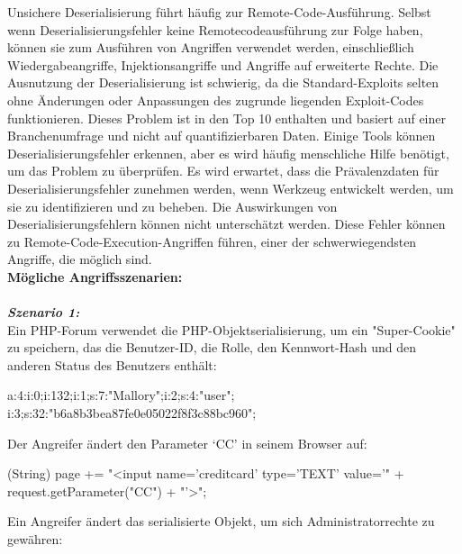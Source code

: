 Unsichere Deserialisierung führt häufig zur Remote-Code-Ausführung. Selbst wenn Deserialisierungsfehler keine Remotecodeausführung zur Folge haben, können sie zum Ausführen von Angriffen verwendet werden, einschließlich Wiedergabeangriffe, Injektionsangriffe und Angriffe auf erweiterte Rechte\cite[6]{owasp17top10}. Die Ausnutzung der Deserialisierung ist schwierig, da die Standard-Exploits selten ohne Änderungen oder Anpassungen des zugrunde liegenden Exploit-Codes funktionieren. Dieses Problem ist in den Top 10 enthalten und basiert auf einer Branchenumfrage und nicht auf quantifizierbaren Daten. Einige Tools können Deserialisierungsfehler erkennen, aber es wird häufig menschliche Hilfe benötigt, um das Problem zu überprüfen. Es wird erwartet, dass die Prävalenzdaten für Deserialisierungsfehler zunehmen werden, wenn Werkzeug entwickelt werden, um sie zu identifizieren und zu beheben. Die Auswirkungen von Deserialisierungsfehlern können nicht unterschätzt werden. Diese Fehler können zu Remote-Code-Execution-Angriffen führen, einer der schwerwiegendsten Angriffe, die möglich sind\cite[13]{owasp17top10}.\\

\textbf{Mögliche Angriffsszenarien:}\\
\\
\textbf{\textit{Szenario 1:}}\\

Ein PHP-Forum verwendet die PHP-Objektserialisierung, um ein "Super-Cookie" zu speichern, das die Benutzer-ID, die Rolle, den Kennwort-Hash und den anderen Status des Benutzers enthält\cite[13]{owasp17top10}:

\begin{LaTeXCode}[caption={Unsichere Deserialisierung - Beispiel 1},captionpos=b, label=LaTeXCode:ud1][numbers=none]
a:4:{i:0;i:132;i:1;s:7:"Mallory";i:2;s:4:"user";
i:3;s:32:"b6a8b3bea87fe0e05022f8f3c88bc960";}
\end{LaTeXCode}

Der Angreifer ändert den Parameter ‘CC’ in seinem Browser auf:

\begin{LaTeXCode}[caption={Unsichere Deserialisierung - Beispiel 2},captionpos=b, label=LaTeXCode:ud2][numbers=none]
	(String) page += "<input name='creditcard' type='TEXT'
	value='" + request.getParameter("CC") + "'>";
\end{LaTeXCode}

Ein Angreifer ändert das serialisierte Objekt, um sich Administratorrechte zu gewähren:

